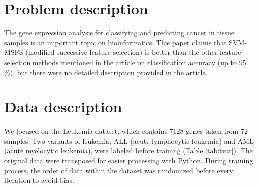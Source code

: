 \documentclass[a4paper,twocolumn]{article} %
\begin{document}

	
	\section*{Problem description}
	\label{sec:prob}
	The gene expression analysis for classifying and predicting cancer in tissue samples is an important topic on bioinformatics. This paper \cite{Bhat2017EvaluatingSA} claims that SVM-MSFS (modified successive feature selection) is better than the other feature selection methods mentioned in the article on classification accuracy (up to 95 \%), but there were no detailed description provided in the article.
	
	\section*{Data description}
	\label{sec:data}
	
	We focused on the Leukemia dataset, which contains 7128 genes taken from 72 samples. Two variants of leukemia, ALL (acute lymphocytic leukemia) and AML (acute myelocytic leukemia), were labeled before training (Table \ref{tab:tvar}). The original data were transposed for easier processing with Python. During training process, the order of data within the dataset was randomized before every iteration to avoid bias.
	
\end{document}
